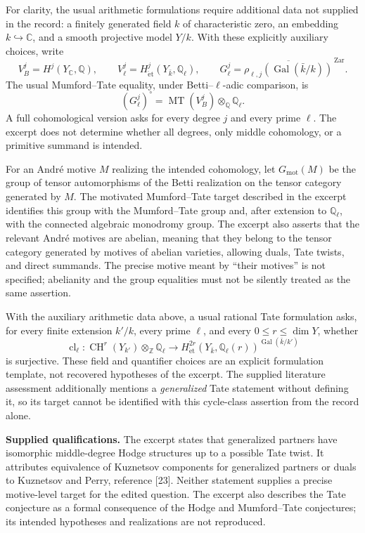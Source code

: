 \documentclass[11pt]{article}
\newcommand{\Z}{\mathbb{Z}}
\newcommand{\Q}{\mathbb{Q}}
\newcommand{\C}{\mathbb{C}}
\begin{document}
For clarity, the usual arithmetic formulations require additional data not supplied in the record: a finitely generated field \(k\) of characteristic zero, an embedding \(k\hookrightarrow\C\), and a smooth projective model \(Y/k\). With these explicitly auxiliary choices, write
\[
V_B^j=H^j(Y_{\C},\Q),\qquad V_\ell^j=H^j_{\mathrm{\acute et}}(Y_{\bar k},\Q_\ell),\qquad
G_\ell^j=\overline{\rho_{\ell,j}(\operatorname{Gal}(\bar k/k))}^{\,\mathrm{Zar}}.
\]
The usual Mumford--Tate equality, under Betti--\(\ell\)-adic comparison, is
\[
(G_\ell^j)^\circ=\operatorname{MT}(V_B^j)\otimes_{\Q}\Q_\ell.
\]
A full cohomological version asks for every degree \(j\) and every prime \(\ell\). The excerpt does not determine whether all degrees, only middle cohomology, or a primitive summand is intended.

For an Andr\'e motive \(M\) realizing the intended cohomology, let \(G_{\mathrm{mot}}(M)\) be the group of tensor automorphisms of the Betti realization on the tensor category generated by \(M\). The motivated Mumford--Tate target described in the excerpt identifies this group with the Mumford--Tate group and, after extension to \(\Q_\ell\), with the connected algebraic monodromy group. The excerpt also asserts that the relevant Andr\'e motives are abelian, meaning that they belong to the tensor category generated by motives of abelian varieties, allowing duals, Tate twists, and direct summands. The precise motive meant by ``their motives'' is not specified; abelianity and the group equalities must not be silently treated as the same assertion.

With the auxiliary arithmetic data above, a usual rational Tate formulation asks, for every finite extension \(k'/k\), every prime \(\ell\), and every \(0\leq r\leq\dim Y\), whether
\[
\operatorname{cl}_\ell:\operatorname{CH}^r(Y_{k'})\otimes_{\Z}\Q_\ell\longrightarrow
H^{2r}_{\mathrm{\acute et}}(Y_{\bar k},\Q_\ell(r))^{\operatorname{Gal}(\bar k/k')}
\]
is surjective. These field and quantifier choices are an explicit formulation template, not recovered hypotheses of the excerpt. The supplied literature assessment additionally mentions a \emph{generalized} Tate statement without defining it, so its target cannot be identified with this cycle-class assertion from the record alone.

\textbf{Supplied qualifications.} The excerpt states that generalized partners have isomorphic middle-degree Hodge structures up to a possible Tate twist. It attributes equivalence of Kuznetsov components for generalized partners or duals to Kuznetsov and Perry, reference [23]. Neither statement supplies a precise motive-level target for the edited question. The excerpt also describes the Tate conjecture as a formal consequence of the Hodge and Mumford--Tate conjectures; its intended hypotheses and realizations are not reproduced.
\end{document}
